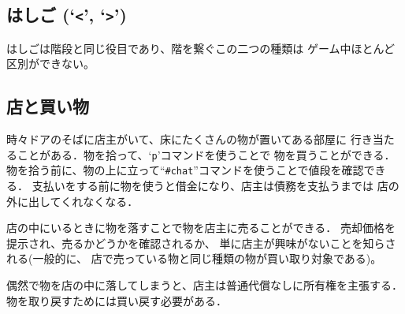 \subsection*{はしご (`{\tt <}', `{\tt >}')}

はしごは階段と同じ役目であり、階を繋ぐこの二つの種類は
ゲーム中ほとんど区別ができない。

\subsection*{店と買い物}

時々ドアのそばに店主がいて、床にたくさんの物が置いてある部屋に
行き当たることがある．物を拾って、`{\tt p}'コマンドを使うことで
物を買うことができる．
物を拾う前に、物の上に立って``{\tt \#chat}''コマンドを使うことで値段を確認できる．
支払いをする前に物を使うと借金になり、店主は債務を支払うまでは
店の外に出してくれなくなる．

店の中にいるときに物を落すことで物を店主に売ることができる．
売却価格を提示され、売るかどうかを確認されるか、
単に店主が興味がないことを知らされる(一般的に、
店で売っている物と同じ種類の物が買い取り対象である)。

偶然で物を店の中に落してしまうと、店主は普通代償なしに所有権を主張する．
物を取り戻すためには買い戻す必要がある．

